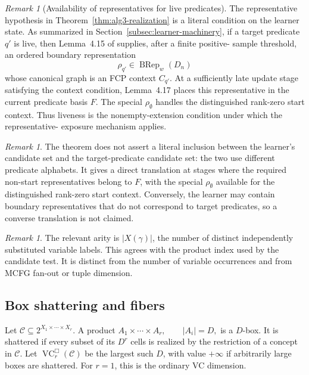 \documentclass[11pt]{article}
\theoremstyle{definition}
\theoremstyle{remark}
\newtheorem{remark}[theorem]{Remark}
\newcommand{\VCbox}{\operatorname{VC}^{\Box}}
\begin{document}
\begin{remark}[Availability of representatives for live predicates]
\label{rem:live-representatives}
The representative hypothesis in Theorem~\ref{thm:alg3-realization} is a
literal condition on the learner state.  As summarized in
Section~\ref{subsec:learner-machinery}, if a target predicate \(q'\) is live,
then Lemma~4.15 of \cite{ShoudaiEtAl2026} supplies, after a finite positive-
sample threshold, an ordered boundary representation
\[
\rho_{q'}\in\operatorname{BRep}_w(D_n)
\]
whose canonical graph is an FCP context \(C_{q'}\).  At a sufficiently late
update stage satisfying the context condition, Lemma~4.17 places this
representative in the current predicate basis \(F\).  The special
\(\rho_\emptyset\) handles the distinguished rank-zero start context.  Thus
liveness is the nonempty-extension condition under which the representative-
exposure mechanism applies.
\end{remark}

\begin{remark}
The theorem does not assert a literal inclusion between the learner's
candidate set and the target-predicate candidate set: the two use different
predicate alphabets.  It gives a direct translation at stages where the
required non-start representatives belong to \(F\), with the special
\(\rho_\emptyset\) available for the distinguished rank-zero start context.  Conversely, the learner may contain
boundary representatives that do not correspond to target predicates, so a
converse translation is not claimed.
\end{remark}

\begin{remark}
The relevant arity is \(|X(\gamma)|\), the number of distinct independently
substituted variable labels.  This agrees with the product index used by the
candidate test.  It is distinct from the number of variable occurrences and
from MCFG fan-out or tuple dimension.
\end{remark}

\subsection{Box shattering and fibers}

Let
\(\mathcal C\subseteq2^{X_1\times\cdots\times X_r}.\)
A product
\(A_1\times\cdots\times A_r, \qquad |A_i|=D,\)
is a \(D\)-box. It is shattered if every subset of its \(D^r\) cells is
realized by the restriction of a concept in \(\mathcal C\). Let
\(\VCbox_r(\mathcal C)\)
be the largest such \(D\), with value \(+\infty\) if arbitrarily large boxes
are shattered. For \(r=1\), this is the ordinary VC dimension.
\end{document}
